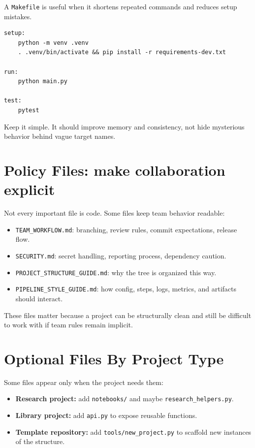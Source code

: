 \documentclass[11pt,oneside]{book}
\begin{document}
A \texttt{Makefile} is useful when it shortens repeated commands and reduces setup mistakes.

\begin{lstlisting}[style=bookcode]
setup:
	python -m venv .venv
	. .venv/bin/activate && pip install -r requirements-dev.txt

run:
	python main.py

test:
	pytest
\end{lstlisting}

Keep it simple.  
It should improve memory and consistency, not hide mysterious behavior behind vague target names.

\section*{Policy Files: make collaboration explicit}

Not every important file is code.  
Some files keep team behavior readable:
\begin{itemize}
  \item \texttt{TEAM\_WORKFLOW.md}: branching, review rules, commit expectations, release flow.
  \item \texttt{SECURITY.md}: secret handling, reporting process, dependency caution.
  \item \texttt{PROJECT\_STRUCTURE\_GUIDE.md}: why the tree is organized this way.
  \item \texttt{PIPELINE\_STYLE\_GUIDE.md}: how config, steps, logs, metrics, and artifacts should interact.
\end{itemize}

These files matter because a project can be structurally clean and still be difficult to work with if team rules remain implicit.

\section*{Optional Files By Project Type}

Some files appear only when the project needs them:
\begin{itemize}
  \item \textbf{Research project:} add \texttt{notebooks/} and maybe \texttt{research\_helpers.py}.
  \item \textbf{Library project:} add \texttt{api.py} to expose reusable functions.
  \item \textbf{Template repository:} add \texttt{tools/new\_project.py} to scaffold new instances of the structure.
\end{itemize}
\end{document}
